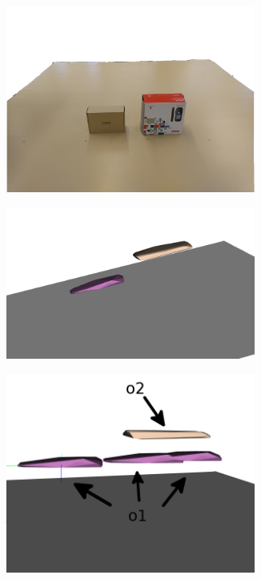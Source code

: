 \begin{figure}[tb]
\centering
\begin{subfigure}[t]{0.3\textwidth}
\centering
\includegraphics[width=0.9\textwidth]{Img/convexhull/example_only_top_surfaces.png}
\caption{}\label{fig:rgb_top_surfaces_example}
\end{subfigure}
\begin{subfigure}[t]{0.3\textwidth}
\centering
\includegraphics[width=0.9\textwidth]{Img/convexhull/cv_top2.png}
\caption{}\label{fig:cv_top}
\end{subfigure}
\begin{subfigure}[t]{0.3\textwidth}
\centering
\includegraphics[width=0.9\textwidth]{Img/convexhull/cv_top_collision2.png}

\end{subfigure}
\end{figure}
